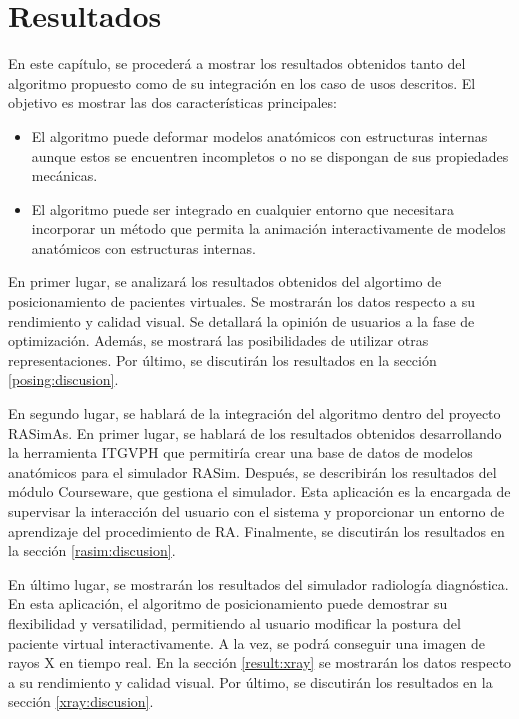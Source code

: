 \chapter{Resultados} 
\label{cap:results}

En este capítulo, se procederá a mostrar los resultados obtenidos tanto del algoritmo propuesto como de su integración en los caso de usos descritos. El objetivo es mostrar las dos características principales: \begin{itemize}
    \item El algoritmo puede deformar modelos anatómicos con estructuras internas aunque estos se encuentren incompletos o no se dispongan de sus propiedades mecánicas. 
    \item El algoritmo puede ser integrado en cualquier entorno que necesitara incorporar un método que permita la animación interactivamente de modelos anatómicos con estructuras internas.
\end{itemize}

En primer lugar, se analizará los resultados obtenidos del algortimo de posicionamiento de pacientes virtuales. Se mostrarán los datos respecto a su rendimiento y calidad visual. Se detallará la opinión de usuarios a la fase de optimización. Además, se mostrará las posibilidades de utilizar otras representaciones. Por último, se discutirán los resultados en la sección \ref{posing:discusion}.

En segundo lugar, se hablará de la integración del algoritmo dentro del proyecto \ac{RASimAs}. En primer lugar, se hablará de los resultados obtenidos desarrollando la herramienta \ac{ITGVPH} que permitiría crear una base de datos de modelos anatómicos para el simulador \ac{RASim}. Después, se describirán los resultados del módulo \ac{Courseware}, que gestiona el simulador. Esta aplicación es la encargada de supervisar la interacción del usuario con el sistema y proporcionar un entorno de aprendizaje del procedimiento de \ac{RA}. Finalmente, se discutirán los resultados en la sección \ref{rasim:discusion}.

En último lugar, se mostrarán los resultados del simulador radiología diagnóstica. En esta aplicación, el algoritmo de posicionamiento puede demostrar su flexibilidad y versatilidad, permitiendo al usuario modificar la postura del paciente virtual interactivamente. A la vez, se podrá conseguir una imagen de rayos X en tiempo real. En la sección \ref{result:xray} se mostrarán los datos respecto a su rendimiento y calidad visual. Por último,  se discutirán los resultados en la sección \ref{xray:discusion}.


